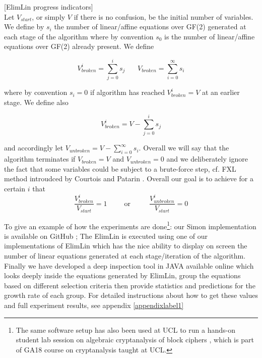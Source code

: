 \begin{mydef}\label{ElimLinProgressParams}
	[ElimLin progress indicators]\\
	Let $V_{start}$, or simply $V$ if there is no confusion,
	be the initial number of variables.
	We define by $s_i$ the number of
	linear/affine equations over GF(2)
	generated at each stage of the algorithm
	where by convention $s_0$ is the number of
	linear/affine equations over GF(2) already present.
	We define
	
	\begin{equation}
	V^i_{broken}=\sum_{j=0}^{i} s_j ~~~~~~~~V_{broken}=\sum_{i=0}^{\infty} s_i
	\end{equation}
	
	where by convention $s_i=0$ if algorithm has reached
	$V^i_{broken}=V$ at an earlier stage.
	We define also
	
	\begin{equation} \label{EQ:unborken}
	V^i_{broken}=V-\sum_{j=0}^{i} s_j
	\end{equation}
	
	and accordingly let
	$
	V_{unbroken}=V-\sum_{i=0}^{\infty} s_i.
	$
	Overall we will say that the algorithm terminates if
	$V_{broken}=V$ and $V_{unbroken}=0$ and we deliberately ignore the fact that
	some variables could be subject to a brute-force step,
	cf. FXL method introudced by Courtois and Patarin \cite{XL2}.
	Overall our goal is to achieve for a certain $i$ that
	\begin{equation}
	\frac{V^i_{broken}}{V_{start}}=1
	~~~~~~~~~~~\mbox{or}~~~~~~~~~~~~
	\frac{V^i_{unbroken}}{V_{start}}=0
	\end{equation}
	
\end{mydef}

To give an example of how the experiments are done\footnote{The same software setup has also been used at UCL to run a hands-on student lab session on algebraic cryptanalysis of block ciphers \cite{AlgteachElimLinLab}, which is part of GA18 course on cryptanalysis taught at UCL.}: our Simon implementation is available on GitHub  \cite{AlgteachElimLinLab,CourtoisSoftware}; The ElimLin is executed using one of our implementations of
ElimLin \cite{AlgteachElimLinLab,CourtoisSoftware} which has the nice ability to display on screen the number of linear equations generated at each stage/iteration of the algorithm. Finally we have developed a deep inspection tool in JAVA available online \cite{CourtoisSoftware} which looks deeply inside the equations generated by ElimLin, group the equations based on different selection criteria then provide statistics and predictions for the growth rate of each group. For detailed instructions about how to get these values and full experiment results, see appendix \ref{appendixlabel1}


